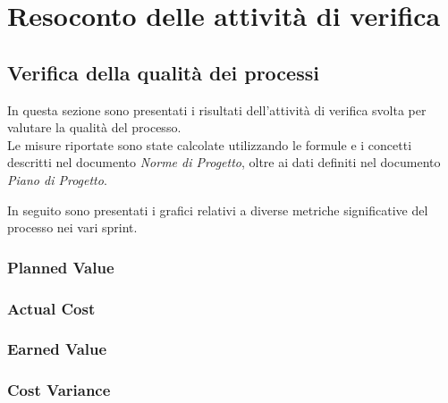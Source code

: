 \section{Resoconto delle attività di verifica}

\subsection{Verifica della qualità dei processi}
In questa sezione sono presentati i risultati dell'attività di verifica svolta per valutare la qualità del processo.\\
Le misure riportate sono state calcolate utilizzando le formule e i concetti descritti nel documento \textit{Norme di Progetto}, oltre ai dati definiti nel documento \textit{Piano di Progetto}.



In seguito sono presentati i grafici relativi a diverse metriche significative del processo nei vari sprint.

\subsubsection{Planned Value}

\subsubsection{Actual Cost}

\subsubsection{Earned Value}

\subsubsection{Cost Variance}

